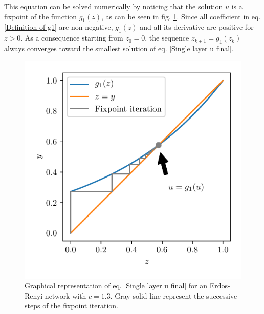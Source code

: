 \documentclass[
11pt, %
english, %
singlespacing, %
nolistspacing, %
liststotoc, %
headsepline, %
]{MastersDoctoralThesis} %
\begin{document}
This equation can be solved numerically by noticing that the solution $u$ is a fixpoint of the function $g_1(z)$, as can be seen in fig. \ref{Figure: Solution of of u = g1(u) graphically}. Since all coefficient in eq. \eqref{Definition of g1} are non negative, $g_1(z)$ and all its derivative are positive for $z > 0$. As a consequence starting from $z_0 = 0$, the sequence $z_{k + 1}  = g_1(z_k)$ always converges toward the smallest solution of eq. \eqref{Single layer u final}.

\begin{figure}
	\includegraphics[scale=1]{u_solution_graphically.pdf}
	\caption{Graphical representation of eq. \eqref{Single layer u final} for an Erdos-Renyi network with $c = 1.3$. Gray solid line represent the successive steps of the fixpoint iteration.}
	\label{Figure: Solution of of u = g1(u) graphically}
\end{figure}
\end{document}

